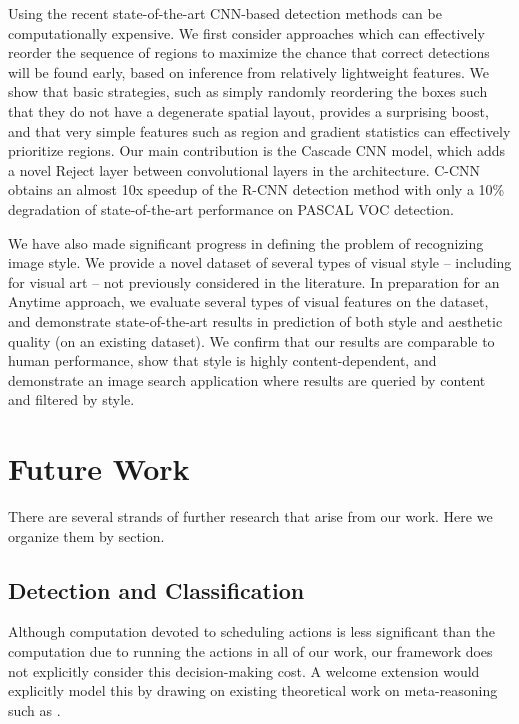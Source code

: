 Using the recent state-of-the-art CNN-based detection methods can be computationally expensive.
We first consider approaches which can effectively reorder the sequence of regions to maximize the chance that correct detections will be found early, based on inference from relatively lightweight features.
We show that basic strategies, such as simply randomly reordering the boxes such that they do not have a degenerate spatial layout, provides a surprising boost, and that very simple features such as region and gradient statistics can effectively prioritize regions.
Our main contribution is the Cascade CNN model, which adds a novel Reject layer between convolutional layers in the architecture.
C-CNN obtains an almost 10x speedup of the R-CNN detection method with only a 10\% degradation of state-of-the-art performance on PASCAL VOC detection.

We have also made significant progress in defining the problem of recognizing image style.
We provide a novel dataset of several types of visual style -- including for visual art -- not previously considered in the literature.
In preparation for an Anytime approach, we evaluate several types of visual features on the dataset, and demonstrate state-of-the-art results in prediction of both style and aesthetic quality (on an existing dataset).
We confirm that our results are comparable to human performance, show that style is highly content-dependent, and demonstrate an image search application where results are queried by content and filtered by style.

\section{Future Work}

There are several strands of further research that arise from our work.
Here we organize them by section.

\subsection{Detection and Classification}

Although computation devoted to scheduling actions is less significant than the computation due to running the actions in all of our work, our framework does not explicitly consider this decision-making cost.
A welcome extension would explicitly model this by drawing on existing theoretical work on meta-reasoning such as \cite{Hay2012}.

